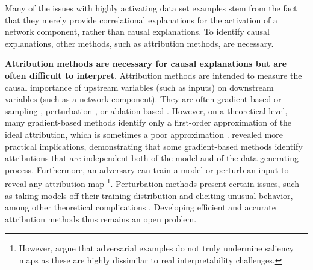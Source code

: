 Many of the issues with highly activating data set examples stem from the fact that they merely provide correlational explanations for the activation of a network component, rather than causal explanations. To identify causal explanations, other methods, such as attribution methods, are necessary.

\textbf{Attribution methods are necessary for causal explanations but are often difficult to interpret}. Attribution methods \citep{Simonyan_2014_BackpropVisualisation, Nguyen_2016_FeatureVisualization, Selvaraju_2019_GradCAM, Sundarajan_2017_IntegratedGradients, Fong_2017_MaskingBasedCausalAttribution, Lundberg_2017_SHAP,Ribiero_2016_LIME} are intended to measure the causal importance of upstream variables (such as inputs) on downstream variables (such as a network component). They are often gradient-based \citep{Mozer_1988_skeletonization, Simonyan_2014_BackpropVisualisation, Nguyen_2016_FeatureVisualization, Selvaraju_2019_GradCAM, Sundarajan_2017_IntegratedGradients, wang2024gradientbasedfeatureattribution} or sampling-, perturbation-, or ablation-based \citep{Fong_2017_MaskingBasedCausalAttribution, vig2020causalmediationanalysisinterpreting, geiger2020neuralnaturallanguageinference, Ghorbani_2020,meng2022locating, Chan_Garriga-alonso_Goldowsky-Dill_2022,NeelNanda_2023a}. However, on a theoretical level, many gradient-based methods identify only a first-order approximation of the ideal attribution, which is sometimes a poor approximation \citep{watson2022conceptual}. \citet{adebayo2020sanitycheckssaliencymaps} revealed more practical implications, demonstrating that some gradient-based methods identify attributions that are independent both of the model and of the data generating process. Furthermore, an adversary can train a model or perturb an input to reveal any attribution map \citep{Dombrowski_2019_advances, Ghorbani_Abid_Zou_2019, Heo_2019_Advances, Kindermans2019saliencymethods, Slack_2020_foolinglime, zhang2019interpretabledeeplearning}\footnote{However, \citet{Freiesleben_2023_weneedtotalk} argue that adversarial examples do not truly undermine saliency maps as these are highly dissimilar to real interpretability challenges.}. Perturbation methods present certain issues, such as taking models off their training distribution and eliciting unusual behavior, among other theoretical complications \citep{feng-etal-2018-pathologies, molnar2021generalpitfallsmodelagnosticinterpretation, hooker2021unrestrictedpermutationforcesextrapolation, molnar2024model, Freiesleben_2023_weneedtotalk, Slac_2021_advances}. Developing efficient and accurate attribution methods thus remains an open problem.

